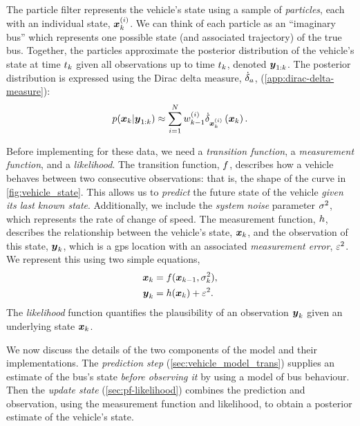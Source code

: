 The particle filter represents the vehicle's state using a sample of \emph{particles}, each with an individual state, $\boldsymbol x_k^{(i)}$. We can think of each particle as an ``imaginary bus'' which represents one possible state (and associated trajectory) of the true bus. Together, the particles approximate the posterior distribution of the vehicle's state at time $t_k$ given all observations up to time $t_k$, denoted $\boldsymbol{y}_{1:k}$. The posterior distribution is expressed using the Dirac delta measure, $\dot\delta_a$, (\cref{app:dirac-delta-measure}):
\begin{equation}
\label{eq:vehicle_state_dirac}
p(\boldsymbol x_k | \boldsymbol{y}_{1:k}) \approx
\sum_{i=1}^N w^{(i)}_{k-1} \dot\delta_{\boldsymbol x_k^{(i)}}\left(\boldsymbol x_k\right).
\end{equation}

Before implementing  for these data, we need a \emph{transition function}, a \emph{measurement function}, and a \emph{likelihood}. The transition function, $f$, describes how a vehicle behaves between two consecutive observations: that is, the shape of the curve in \cref{fig:vehicle_state}. This allows us to \emph{predict} the future state of the vehicle \emph{given its last known state}. Additionally, we include the \emph{system noise} parameter $\sigma^2$, which represents the rate of change of speed. The measurement function, $h$, describes the relationship between the vehicle's state, $\boldsymbol x_k$, and the observation of this state, $\boldsymbol{y}_k$, which is a \gls{gps} location with an associated \emph{measurement error}, $\varepsilon^2$. We represent this using two simple equations,
\begin{equation}
\label{eq:vehicle_model}
\begin{split}
\boldsymbol x_k &= f(\boldsymbol x_{k-1}, \sigma^2_k), \\
\boldsymbol{y}_k &= h(\boldsymbol x_k) + \varepsilon^2.
\end{split}
\end{equation}
The \emph{likelihood} function quantifies the plausibility of an observation $\boldsymbol{y}_k$ given an underlying state $\boldsymbol x_k$.


We now discuss the details of the two components of the model and their implementations. The \emph{prediction step} (\cref{sec:vehicle_model_trans}) supplies an estimate of the bus's state \emph{before observing it} by using a model of bus behaviour. Then the \emph{update state} (\cref{sec:pf-likelihood}) combines the prediction and observation, using the measurement function and likelihood, to obtain a posterior estimate of the vehicle's state.
